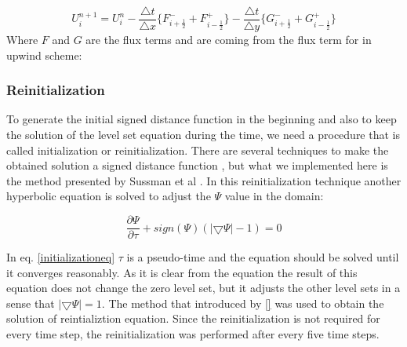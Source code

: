 \documentclass[letterpaper,10pt]{article}
\begin{document}
\begin{equation}
   \label{explicit}
   U_i^{n+1} = U_i^n - \frac{\bigtriangleup t}{\bigtriangleup x} \{F_{i+\frac{1}{2}}^- + F_{i-\frac{1}{2}}^+ \}
   - \frac{\bigtriangleup t}{\bigtriangleup y} \{G_{i+\frac{1}{2}}^- + G_{i-\frac{1}{2}}^+ \}
  \end{equation}
Where $F$ and $G$ are the flux terms and are coming from the flux term for in upwind scheme:


% 
% 
         

\subsubsection{Reinitialization} \label{reinitialization}

To generate the initial signed distance function in the beginning and also to keep the solution of the level set equation during 
the time, we need a procedure that is called initialization or reinitialization. There are several techniques to make the obtained 
solution a signed distance function \cite{levelsetbook}, but what we implemented here is the method presented by 
Sussman et al \cite{Sussman}. In this reinitialization technique another hyperbolic equation is solved to adjust the $\varPsi$ value 
in the domain:

\begin{equation}\label{initializationeq}
 \frac{\partial \varPsi}{\partial \tau} + sign(\varPsi) (|\bigtriangledown \varPsi| - 1)= 0 
\end{equation}

In eq. \eqref{initializationeq} $\tau$ is a pseudo-time and the equation should be solved until it converges reasonably. 
As it is clear from the equation the result of this equation does not change the zero level set, but it adjusts the other level sets 
in a sense that $|\bigtriangledown \varPsi|=1$.
The method that introduced by \ref{} was used to obtain the solution of reintializtion equation. Since the reinitialization 
is not required for every time step, the reinitialization was performed after every five time steps.
\end{document}
